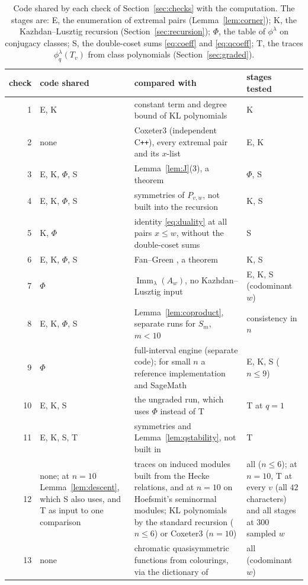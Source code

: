 \documentclass[11pt]{amsart}
\theoremstyle{definition}
\theoremstyle{remark}
\newcommand{\Imm}{\operatorname{Imm}}
\begin{document}
\begin{table}[ht]
\small
\begin{tabular}{rp{2.3cm}p{6.4cm}p{2.6cm}}
\toprule
check & code shared & compared with & stages tested\\
\midrule
1 & E, K & constant term and degree bound of KL polynomials & K\\
2 & none & \textsf{Coxeter3} (independent C\texttt{++}), every extremal pair and its $x$-list & E, K\\
3 & E, K, $\Phi$, S & Lemma~\ref{lem:J}(3), a theorem & $\Phi$, S\\
4 & E, K, $\Phi$, S & symmetries of $P_{v,w}$, not built into the recursion & K, S\\
5 & K, $\Phi$ & identity \eqref{eq:duality} at all pairs $x\le w$, without the double-coset sums & S\\
6 & E, K, $\Phi$, S & Fan--Green \cite{FG}, a theorem & K, S\\
7 & $\Phi$ & $\Imm_\lambda(A_w)$, no Kazhdan--Lusztig input & E, K, S (codominant $w$)\\
8 & E, K, $\Phi$, S & Lemma~\ref{lem:coproduct}, separate runs for $S_m$, $m<10$ & consistency in $n$\\
9 & $\Phi$ & full-interval engine (separate code); for small $n$ a reference implementation and SageMath & E, K, S ($n\le9$)\\
10 & E, K, S & the ungraded run, which uses $\Phi$ instead of T & T at $q=1$\\
11 & E, K, S, T & symmetries and Lemma~\ref{lem:qstability}, not built in & T\\
12 & none; at $n=10$ Lemma~\ref{lem:descent}, which S also uses, and T as input to one comparison & traces on induced modules built from the Hecke relations, and at $n=10$ on Hoefsmit's seminormal modules; KL polynomials by the standard recursion ($n\le6$) or \textsf{Coxeter3} ($n=10$) & all ($n\le6$); at $n=10$, T at every $v$ (all $42$ characters) and all stages at $300$ sampled $w$\\
13 & none & chromatic quasisymmetric functions from colourings, via the dictionary of \cite{CHSS} & all (codominant $w$)\\
\bottomrule
\end{tabular}
\caption{Code shared by each check of Section~\ref{sec:checks} with the computation. The stages are: E, the enumeration of extremal pairs (Lemma~\ref{lem:corner}); K, the Kazhdan--Lusztig recursion (Section~\ref{sec:recursion}); $\Phi$, the table of $\phi^\lambda$ on conjugacy classes; S, the double-coset sums \eqref{eq:coeff} and \eqref{eq:qcoeff}; T, the traces $\phi^\lambda_q(T_v)$ from class polynomials (Section~\ref{sec:graded}).}\label{tab:depend}
\end{table}
\end{document}
